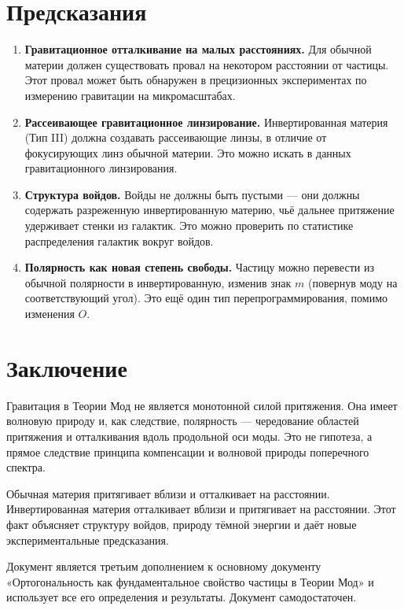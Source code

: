 \documentclass[12pt,a4paper]{article}
\begin{document}
\section{Предсказания}
\begin{enumerate}[label=\arabic*.]
    \item \textbf{Гравитационное отталкивание на малых расстояниях.} Для обычной материи должен существовать провал на некотором расстоянии от частицы. Этот провал может быть обнаружен в прецизионных экспериментах по измерению гравитации на микромасштабах.
    \item \textbf{Рассеивающее гравитационное линзирование.} Инвертированная материя (Тип III) должна создавать рассеивающие линзы, в отличие от фокусирующих линз обычной материи. Это можно искать в данных гравитационного линзирования.
    \item \textbf{Структура войдов.} Войды не должны быть пустыми --- они должны содержать разреженную инвертированную материю, чьё дальнее притяжение удерживает стенки из галактик. Это можно проверить по статистике распределения галактик вокруг войдов.
    \item \textbf{Полярность как новая степень свободы.} Частицу можно перевести из обычной полярности в инвертированную, изменив знак $m$ (повернув моду на соответствующий угол). Это ещё один тип перепрограммирования, помимо изменения $O$.
\end{enumerate}

\section{Заключение}
Гравитация в Теории Мод не является монотонной силой притяжения. Она имеет волновую природу и, как следствие, полярность --- чередование областей притяжения и отталкивания вдоль продольной оси моды. Это не гипотеза, а прямое следствие принципа компенсации и волновой природы поперечного спектра.

Обычная материя притягивает вблизи и отталкивает на расстоянии. Инвертированная материя отталкивает вблизи и притягивает на расстоянии. Этот факт объясняет структуру войдов, природу тёмной энергии и даёт новые экспериментальные предсказания.

Документ является третьим дополнением к основному документу «Ортогональность как фундаментальное свойство частицы в Теории Мод» и использует все его определения и результаты. Документ самодостаточен.
\end{document}
